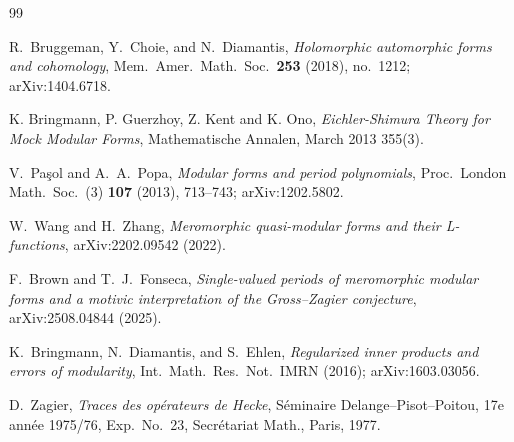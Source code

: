 \documentclass[11pt]{article}
\begin{document}
\begin{thebibliography}{99}

R.\ Bruggeman, Y.\ Choie, and N.\ Diamantis,
\emph{Holomorphic automorphic forms and cohomology},
Mem.\ Amer.\ Math.\ Soc.\ \textbf{253} (2018), no.\ 1212; arXiv:1404.6718.

K. Bringmann, P. Guerzhoy, Z. Kent and K. Ono,
\emph{Eichler-Shimura Theory for Mock Modular Forms},
Mathematische Annalen, March 2013 355(3).

V.\ Pa\c{s}ol and A.\ A.\ Popa,
\emph{Modular forms and period polynomials},
Proc.\ London Math.\ Soc.\ (3) \textbf{107} (2013), 713--743; arXiv:1202.5802.

W.\ Wang and H.\ Zhang,
\emph{Meromorphic quasi-modular forms and their L-functions},
arXiv:2202.09542 (2022).

F.\ Brown and T.\ J.\ Fonseca,
\emph{Single-valued periods of meromorphic modular forms and a motivic
interpretation of the Gross--Zagier conjecture},
arXiv:2508.04844 (2025).

K.\ Bringmann, N.\ Diamantis, and S.\ Ehlen,
\emph{Regularized inner products and errors of modularity},
Int.\ Math.\ Res.\ Not.\ IMRN (2016); arXiv:1603.03056.

D.\ Zagier,
\emph{Traces des op\'erateurs de Hecke},
S\'eminaire Delange--Pisot--Poitou, 17e ann\'ee 1975/76, Exp.\ No.\ 23, Secr\'etariat Math., Paris, 1977.


\end{thebibliography}
\end{document}
